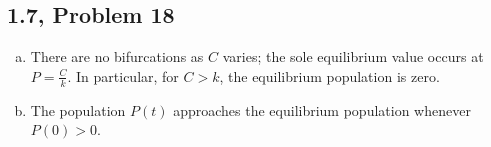 \documentclass[10pt]{mypackage}
\begin{document}
\subsection{1.7, Problem 18}%
\begin{enumerate}[(a)]
  \item There are no bifurcations as $C$ varies; the sole equilibrium value occurs at $P = \frac{C}{k}$. In particular, for $C > k$, the equilibrium population is zero.
  \item The population $P(t)$ approaches the equilibrium population whenever $P(0) > 0$.
\end{enumerate}
\end{document}
